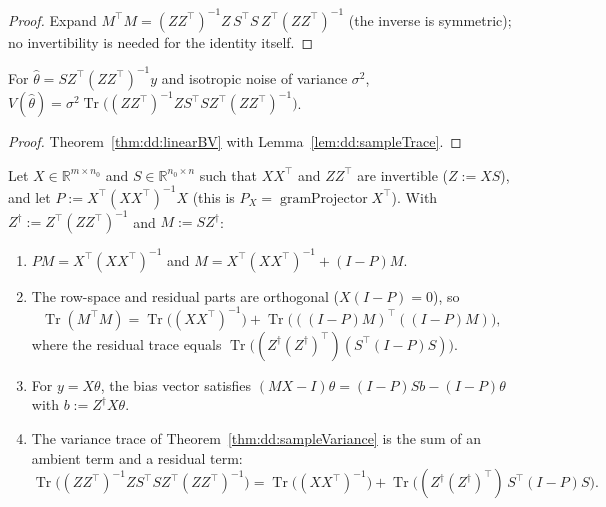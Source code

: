 \begin{proof}
  \leanok
Expand $M^\top M=(ZZ^\top)^{-1}Z\,S^\top S\,Z^\top(ZZ^\top)^{-1}$ (the inverse is symmetric); no invertibility is needed for the
identity itself.
\end{proof}

\begin{theorem}\label{thm:dd:sampleVariance}
  \leanok
For $\hat\theta=SZ^\top(ZZ^\top)^{-1}y$ and isotropic noise of variance $\sigma^2$,
$V(\hat\theta)=\sigma^2\operatorname{Tr}\bigl((ZZ^\top)^{-1}ZS^\top SZ^\top(ZZ^\top)^{-1}\bigr)$.
\end{theorem}

\begin{proof}
  \leanok
Theorem~\ref{thm:dd:linearBV} with Lemma~\ref{lem:dd:sampleTrace}.
\end{proof}

\begin{lemma}\label{lem:dd:sampleDecomp}
  \leanok
Let $X\in\mathbb R^{m\times n_0}$ and $S\in\mathbb R^{n_0\times n}$ such that $XX^\top$ and $ZZ^\top$ are invertible ($Z:=XS$), and let $P:=X^\top(XX^\top)^{-1}X$ (this is $P_X=\operatorname{gramProjector} X^\top$). With $Z^\dagger:=Z^\top(ZZ^\top)^{-1}$ and $M:=SZ^\dagger$:
\begin{enumerate}
  \item $PM=X^\top(XX^\top)^{-1}$ and $M=X^\top(XX^\top)^{-1}+(I-P)M$.
  \item The row-space and residual parts are orthogonal ($X(I-P)=0$), so
  \[
    \operatorname{Tr}(M^\top M)=\operatorname{Tr}\bigl((XX^\top)^{-1}\bigr)+\operatorname{Tr}\bigl(((I-P)M)^\top((I-P)M)\bigr),
  \]
  where the residual trace equals $\operatorname{Tr}\bigl((Z^\dagger(Z^\dagger)^\top)(S^\top(I-P)S)\bigr)$.
  \item For $y=X\theta$, the bias vector satisfies $(MX-I)\theta=(I-P)Sb-(I-P)\theta$ with $b:=Z^\dagger X\theta$.
  \item The variance trace of Theorem~\ref{thm:dd:sampleVariance} is the sum of an ambient term and a residual term:
  \[
    \operatorname{Tr}\bigl((ZZ^\top)^{-1}ZS^\top SZ^\top(ZZ^\top)^{-1}\bigr)=\operatorname{Tr}\bigl((XX^\top)^{-1}\bigr)+\operatorname{Tr}\bigl((Z^\dagger(Z^\dagger)^\top)\,S^\top(I-P)S\bigr).
  \]
\end{enumerate}
\end{lemma}

